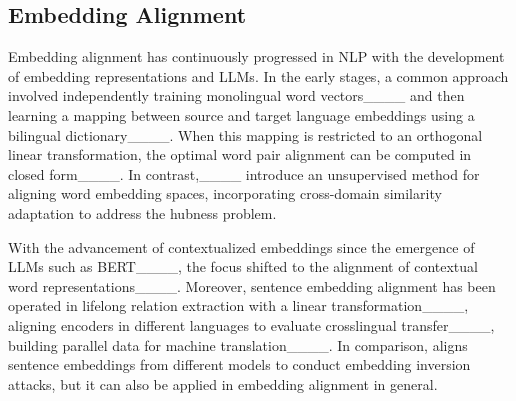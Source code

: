 


\subsection{Embedding Alignment}
Embedding alignment has continuously progressed in NLP with the development of embedding representations and LLMs.
In the early stages, a common approach involved independently training monolingual word vectors____ and then learning a mapping between source and target language embeddings using a bilingual dictionary____. 
When this mapping is restricted to an orthogonal linear transformation, the optimal word pair alignment can be computed in closed form____. 
In contrast,____ introduce an unsupervised method for aligning word embedding spaces, incorporating cross-domain similarity adaptation to address the hubness problem.

With the advancement of contextualized embeddings since the emergence of LLMs such as BERT____, the focus shifted to the alignment of contextual word representations____.
Moreover, sentence embedding alignment has been operated in lifelong relation extraction with a linear transformation____, aligning encoders in different languages to evaluate crosslingual transfer____,  building parallel data for machine translation____. 
In comparison, \textbf{\ourmethod} aligns sentence embeddings from different models to conduct embedding inversion attacks, but it can also be applied in embedding alignment in general. 


